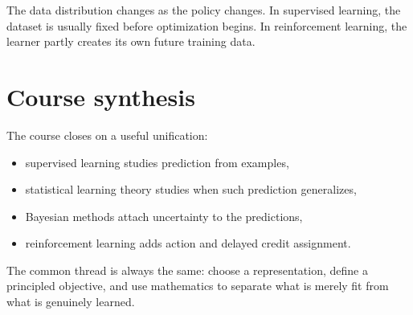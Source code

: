 \begin{aside}
The data distribution changes as the policy changes. In supervised learning, the dataset is usually fixed before optimization begins. In reinforcement learning, the learner partly creates its own future training data.
\end{aside}

\section{Course synthesis}

The course closes on a useful unification:
\begin{itemize}
  \item supervised learning studies prediction from examples,
  \item statistical learning theory studies when such prediction generalizes,
  \item Bayesian methods attach uncertainty to the predictions,
  \item reinforcement learning adds action and delayed credit assignment.
\end{itemize}

The common thread is always the same: choose a representation, define a principled objective, and use mathematics to separate what is merely fit from what is genuinely learned.
